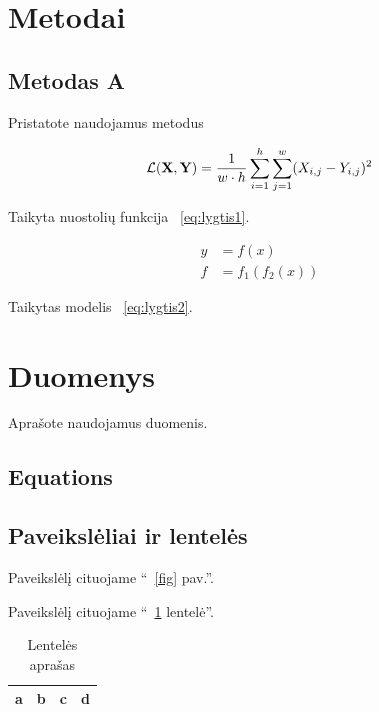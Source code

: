 \documentclass[conference]{IEEEtran}
\begin{document}
\section{Metodai}

\subsection{Metodas A}

Pristatote naudojamus metodus

\begin{equation}
\mathcal{L}({\bf X}, {\bf Y}) = \frac{1}{w \cdot h} \sum_{i=1}^h \sum_{j=1}^w (X_{i, j} - Y_{i, j})^2
\label{eq:lygtis1}
\end{equation}

Taikyta nuostolių funkcija ~\eqref{eq:lygtis1}.

\begin{align}
y & = f(x) \nonumber \\
f & = f_1(f_2(x))
\label{eq:lygtis2}
\end{align}

Taikytas modelis ~\eqref{eq:lygtis2}.


\section{Duomenys}
Aprašote naudojamus duomenis.

\subsection{Equations}



\subsection{Paveikslėliai ir lentelės}

Paveikslėlį cituojame ``~\ref{fig} pav.''.

Paveikslėlį cituojame ``~\ref{tab1} lentelė''.

\begin{table}[htbp]
\caption{Lentelės aprašas}
\begin{center}
\begin{tabular}{|c|c|c|c|}
\hline
a & b & c &  d \\
\hline
\end{tabular}
\label{tab1}
\end{center}
\end{table}
\end{document}

